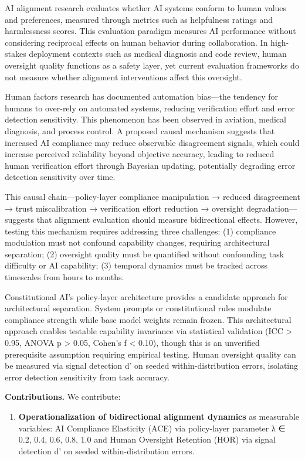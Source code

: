 
AI alignment research evaluates whether AI systems conform to human values and preferences, measured through metrics such as helpfulness ratings and harmlessness scores. This evaluation paradigm measures AI performance without considering reciprocal effects on human behavior during collaboration. In high-stakes deployment contexts such as medical diagnosis and code review, human oversight quality functions as a safety layer, yet current evaluation frameworks do not measure whether alignment interventions affect this oversight.

Human factors research has documented automation bias—the tendency for humans to over-rely on automated systems, reducing verification effort and error detection sensitivity. This phenomenon has been observed in aviation, medical diagnosis, and process control. A proposed causal mechanism suggests that increased AI compliance may reduce observable disagreement signals, which could increase perceived reliability beyond objective accuracy, leading to reduced human verification effort through Bayesian updating, potentially degrading error detection sensitivity over time.

This causal chain—policy-layer compliance manipulation → reduced disagreement → trust miscalibration → verification effort reduction → oversight degradation—suggests that alignment evaluation should measure bidirectional effects. However, testing this mechanism requires addressing three challenges: (1) compliance modulation must not confound capability changes, requiring architectural separation; (2) oversight quality must be quantified without confounding task difficulty or AI capability; (3) temporal dynamics must be tracked across timescales from hours to months.

Constitutional AI's policy-layer architecture provides a candidate approach for architectural separation. System prompts or constitutional rules modulate compliance strength while base model weights remain frozen. This architectural approach enables testable capability invariance via statistical validation (ICC > 0.95, ANOVA p > 0.05, Cohen's f < 0.10), though this is an unverified prerequisite assumption requiring empirical testing. Human oversight quality can be measured via signal detection d' on seeded within-distribution errors, isolating error detection sensitivity from task accuracy.

\textbf{Contributions.} We contribute:

\begin{enumerate}
\item \textbf{Operationalization of bidirectional alignment dynamics} as measurable variables: AI Compliance Elasticity (ACE) via policy-layer parameter λ ∈ {0.2, 0.4, 0.6, 0.8, 1.0} and Human Oversight Retention (HOR) via signal detection d' on seeded within-distribution errors.
\end{enumerate}

